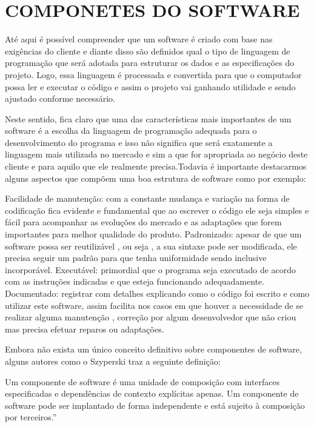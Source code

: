 \documentclass[
	12pt,				%
	oneside,			%
	a4paper,			%
  section=TITLE,
	brazil,				%
	]{abntex2}
\begin{document}
\section{COMPONETES DO SOFTWARE}

Até aqui é possível compreender que um software é criado com base nas exigências
do cliente e diante disso são definidos qual o tipo de linguagem de programação que será
adotada para estruturar os dados e as especificações do projeto. Logo, essa linguagem é
processada e convertida para que o computador possa ler e executar o código e assim o projeto
vai ganhando utilidade e sendo ajustado conforme necessário.

Neste sentido, fica claro que uma das características mais importantes de um
software é a escolha da linguagem de programação adequada para o desenvolvimento do
programa e isso não significa que será exatamente a linguagem mais utilizada no mercado e
sim a que for apropriada ao negócio deste cliente e para aquilo que ele realmente
precisa.Todavia é importante destacarmos alguns aspectos que compõem uma boa estrutura de
software como por exemplo:

Facilidade de manutenção: com a constante mudança e variação na forma de
codificação fica evidente e fundamental que ao escrever o código ele seja simples e fácil para
acompanhar as evoluções do mercado e as adaptações que forem importantes para melhor
qualidade do produto.
Padronizado: apesar de que um software possa ser reutilizável , ou seja , a sua
sintaxe pode ser modificada, ele precisa seguir um padrão para que tenha uniformidade sendo
inclusive incorporável.
Executável: primordial que o programa seja executado de acordo com as instruções
indicadas e que esteja funcionando adequadamente.
Documentado: registrar com detalhes explicando como o código foi escrito e
como utilizar este software, assim facilita nos casos em que houver a necessidade de se realizar
alguma manutenção , correção por algum desenvolvedor que não criou mas precisa efetuar
reparos ou adaptações.

Embora não exista um único conceito definitivo sobre componentes de
software, alguns autores como o Szyperski traz a seguinte definição:

\begin{citacao}Um componente de software é uma unidade de composição com interfaces
especificadas e dependências de contexto explícitas apenas. Um componente de
software pode ser implantado de forma independente e está sujeito à composição por
terceiros.” \cite{Szyperski}
\end{citacao}
\end{document}
